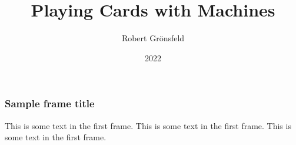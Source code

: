\documentclass{beamer}
\title{Playing Cards with Machines}
\author{Robert Grönsfeld}
\institute{Baloise}
\date{2022}
\begin{document}
\frame{\titlepage}

\begin{frame}
\frametitle{Sample frame title}
This is some text in the first frame. This is some text in the first frame. This is some text in the first frame.
\end{frame}
\end{document}
